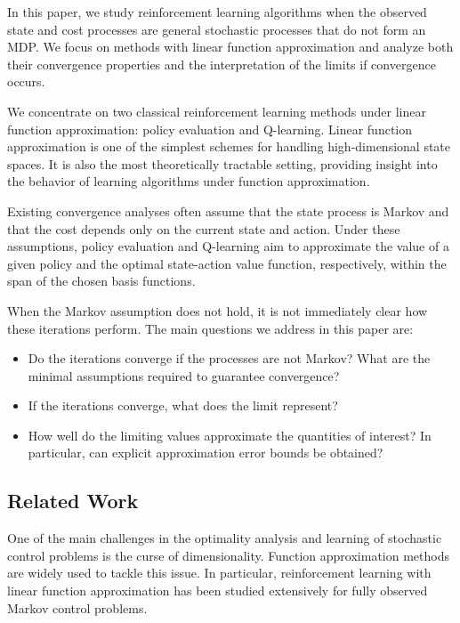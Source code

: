 \documentclass[11pt]{article}
\begin{document}
In this paper, we study reinforcement learning algorithms when the observed state and cost processes are general stochastic processes that do not form an MDP. We focus on methods with linear function approximation and analyze both their convergence properties and the interpretation of the limits if convergence occurs.

We concentrate on two classical reinforcement learning methods under linear function approximation: policy evaluation and Q-learning. Linear function approximation is one of the simplest schemes for handling high-dimensional state spaces. It is also the most theoretically tractable setting, providing insight into the behavior of learning algorithms under function approximation.

Existing convergence analyses often assume that the state process is Markov and that the cost depends only on the current state and action. Under these assumptions, policy evaluation and Q-learning aim to approximate the value of a given policy and the optimal state-action value function, respectively, within the span of the chosen basis functions. 

When the Markov assumption does not hold, it is not immediately clear how these iterations perform. The main questions we address in this paper are:
\begin{itemize}
\item Do the iterations converge if the processes are not Markov? What are the minimal assumptions required to guarantee convergence?
\item If the iterations converge, what does the limit represent?
\item How well do the limiting values approximate the quantities of interest? In particular, can explicit approximation error bounds be obtained?
\end{itemize}




\subsection{Related Work}

One of the main challenges in the optimality analysis and learning of stochastic control problems is the curse of dimensionality. Function approximation methods are widely used to tackle this issue. In particular, reinforcement learning with linear function approximation has been studied extensively for fully observed Markov control problems.
\end{document}
